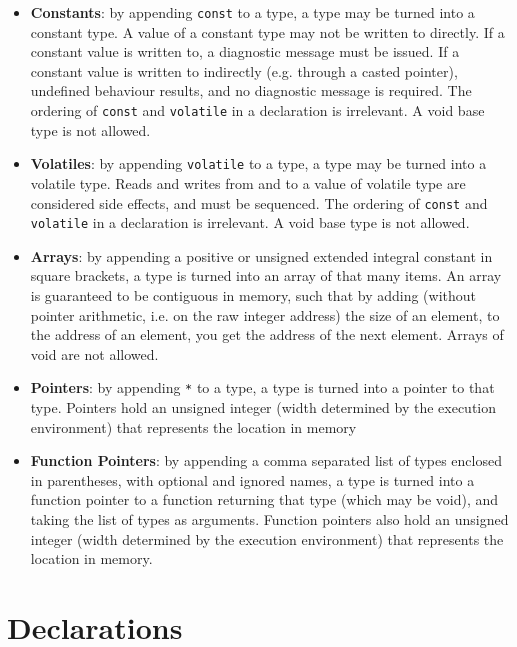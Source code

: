 \documentclass[letterpaper,12pt]{book}
\begin{document}
\begin{itemize}
	\item \textbf{Constants}: by appending \texttt{const} to a type, a type may be turned into a constant type. A value of a constant type may not be written to directly. If a constant value is written to, a diagnostic message must be issued. If a constant value is written to indirectly (e.g. through a casted pointer), undefined behaviour results, and no diagnostic message is required. The ordering of \texttt{const} and \texttt{volatile} in a declaration is irrelevant. A void base type is not allowed.
	
	\item \textbf{Volatiles}: by appending \texttt{volatile} to a type, a type may be turned into a volatile type. Reads and writes from and to a value of volatile type are considered side effects, and must be sequenced. The ordering of \texttt{const} and \texttt{volatile} in a declaration is irrelevant. A void base type is not allowed.
	
	\item \textbf{Arrays}: by appending a positive or unsigned extended integral constant in square brackets, a type is turned into an array of that many items. An array is guaranteed to be contiguous in memory, such that by adding (without pointer arithmetic, i.e. on the raw integer address) the size of an element, to the address of an element, you get the address of the next element. Arrays of void are not allowed.
	
	\item \textbf{Pointers}: by appending \texttt{*} to a type, a type is turned into a pointer to that type. Pointers hold an unsigned integer (width determined by the execution environment) that represents the location in memory 
	
	\item \textbf{Function Pointers}: by appending a comma separated list of types enclosed in parentheses, with optional and ignored names, a type is turned into a function pointer to a function returning that type (which may be void), and taking the list of types as arguments. Function pointers also hold an unsigned integer (width determined by the execution environment) that represents the location in memory.
\end{itemize}

\chapter{Declarations}
\end{document}
